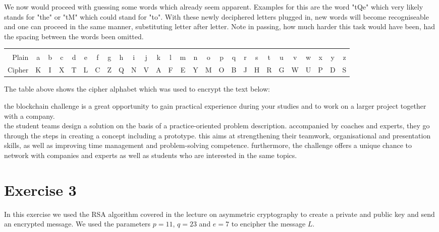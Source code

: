 \documentclass[12pt]{article}
\begin{document}
We now would proceed with guessing some words which already seem apparent. Examples for this are the word "tQe" which very likely stands for "the" or "tM" which could stand for "to". With these newly deciphered letters plugged in, new words will become recogniseable and one can proceed in the same manner, substituting letter after letter. Note in passing, how much harder this task would have been, had the spacing between the words been omitted.

\begin{table}[h!]
	\centering
	\resizebox{\textwidth}{!} {
		\begin{tabular}{ r  c  c  c  c  c  c  c  c  c  c  c  c  c  c  c  c  c  c  c  c  c  c  c  c  c  c}
			\hline
			&&&&&&&&&&&&&&&&&&&&&&&&&&\\[-3.3mm]
			Plain & a & b & c & d & e & f & g & h & i & j & k & l & m & n & o & p & q & r & s & t  & u & v & w & x & y & z \\[1mm]
			Cipher & K&I&X&T&L&C&Z&Q&N&V&A&F&E&Y&M&O&B&J&H&R&G&W&U&P&D&S \\[0.5mm]
			\hline
		\end{tabular}
	}
\end{table}

The table above shows the cipher alphabet which was used to encrypt the text below:\par

the blockchain challenge is a great opportunity to gain practical experience during your studies and to work on a larger project together with a company.\\
the student teams design a solution on the basis of a practice-oriented problem description. accompanied by coaches and experts, they go through the steps in creating a concept including a prototype. this aims at strengthening their teamwork, organisational and presentation skills, as well as improving time management and problem-solving competence. furthermore, the challenge offers a unique chance to network with companies and experts as well as students who are interested in the same topics.

\newpage

\section*{Exercise 3}
\label{sec:RSA}
In this exercise we used the RSA algorithm covered in the lecture on asymmetric cryptography to create a private and public key and send an encrypted message. We used the parameters $p = 11$, $q = 23$ and $e = 7$ to encipher the message $L$.
\end{document}
